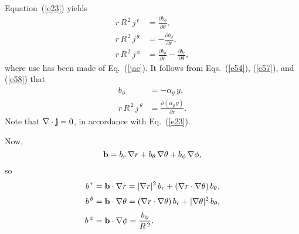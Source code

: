 \documentclass[12pt,prb,aps,notitlepage]{revtex4-1}
\begin{document}
Equation~(\ref{e23}) yields 
\begin{align}
r\,R^{\,2}\,j^{\,r} &= \frac{\partial b_\phi}{\partial\theta},\label{e57}\\[0.5ex]
r\,R^{\,2}\,j^{\,\theta} &= -\frac{\partial b_\phi}{\partial r},\label{e58}\\[0.5ex]
r\,R^{\,2}\,j^{\,\phi}&= \frac{\partial b_\theta}{\partial r} -\frac{\partial b_r}{\partial \theta},\label{e59}
\end{align}
where use has been made of Eq.~(\ref{jac}). It follows from Eqs.~(\ref{e54}), (\ref{e57}), and (\ref{e58}) that
\begin{align}\label{e43yy}
b_\phi &=-\alpha_g\,y,\\[0.5ex]
r\,R^{\,2}\,j^{\,\theta}&=  \frac{\partial (\alpha_g\,y)}{\partial r}.\label{e44yy}
\end{align}
Note that $\nabla\cdot{\bf j} = 0$, in accordance with Eq.~(\ref{e23}).

Now, 
\begin{equation}
{\bf b} = b_r\,\nabla r + b_\theta\,\nabla\theta+b_\phi\,\nabla\phi,
\end{equation}
so
\begin{align}
b^{\,r} &= {\bf b}\cdot\nabla r = |\nabla r|^2\,b_r + (\nabla r\cdot\nabla\theta)\,b_\theta,\label{e61}\\[0.5ex]
b^{\,\theta} &= {\bf b}\cdot\nabla \theta = (\nabla r\cdot\nabla\theta)\,b_r + |\nabla\theta|^2\,b_\theta,\label{e62}\\[0.5ex]
b^{\,\phi}&={\bf b}\cdot\nabla\phi =\frac{b_\phi}{R^{\,2}}.\label{e63}
\end{align}
\end{document}
